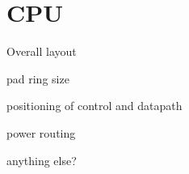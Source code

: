 

\section{CPU}

Overall layout 

pad ring size

positioning of control and datapath

power routing

anything else?
